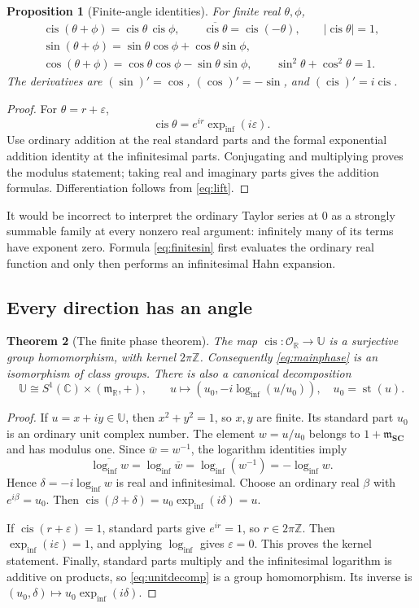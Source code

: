 \documentclass[11pt,letterpaper]{article}
\newtheorem{theorem}{Theorem}[section]
\newtheorem{proposition}[theorem]{Proposition}
\theoremstyle{definition}
\theoremstyle{remark}
\newcommand{\SC}{\mathbf{SC}}
\newcommand{\R}{\mathbb R}\newcommand{\C}{\mathbb C}
\newcommand{\Z}{\mathbb Z}\newcommand{\N}{\mathbb N}
\newcommand{\OO}{\mathcal O}\newcommand{\mm}{\mathfrak m}
\newcommand{\UU}{\mathbb U}\newcommand{\HH}{\mathcal H}
\newcommand{\st}{\operatorname{st}}
\newcommand{\cis}{\operatorname{cis}}
\newcommand{\expi}{\operatorname{exp}_{\mathrm{inf}}}
\newcommand{\logi}{\operatorname{log}_{\mathrm{inf}}}
\numberwithin{equation}{section}
\begin{document}
\begin{proposition}[Finite-angle identities]\label{prop:finiteidentities}
For finite real $\theta,\phi$,
\begin{gather*}
 \cis(\theta+\phi)=\cis\theta\,\cis\phi,\qquad
 \overline{\cis\theta}=\cis(-\theta),\qquad |\cis\theta|=1,\\
 \sin(\theta+\phi)=\sin\theta\cos\phi+\cos\theta\sin\phi,\\
 \cos(\theta+\phi)=\cos\theta\cos\phi-\sin\theta\sin\phi,\qquad
 \sin^2\theta+\cos^2\theta=1.
\end{gather*}
The derivatives are $(\sin)'=\cos$, $(\cos)'=-\sin$, and $(\cis)'=i\cis$.
\end{proposition}
\begin{proof}
For $\theta=r+\varepsilon$,
\[
 \cis\theta=e^{ir}\expi(i\varepsilon).
\]
Use ordinary addition at the real standard parts and the formal exponential addition identity at the infinitesimal parts. Conjugating and multiplying proves the modulus statement; taking real and imaginary parts gives the addition formulas. Differentiation follows from \eqref{eq:lift}.
\end{proof}
It would be incorrect to interpret the ordinary Taylor series at $0$ as a strongly summable family at every nonzero real argument: infinitely many of its terms have exponent zero. Formula \eqref{eq:finitesin} first evaluates the ordinary real function and only then performs an infinitesimal Hahn expansion.

\subsection{Every direction has an angle}
\begin{theorem}[The finite phase theorem]\label{thm:phase}
The map $\cis:\OO_{\R}\to\UU$ is a surjective group homomorphism, with kernel $2\pi\Z$. Consequently \eqref{eq:mainphase} is an isomorphism of class groups. There is also a canonical decomposition
\begin{equation}\label{eq:unitdecomp}
 \UU\cong S^1(\C)\times(\mm_{\R},+),\qquad
 u\longmapsto\left(u_0,-i\logi(u/u_0)\right),\quad u_0=\st(u).
\end{equation}
\end{theorem}
\begin{proof}
If $u=x+iy\in\UU$, then $x^2+y^2=1$, so $x,y$ are finite. Its standard part $u_0$ is an ordinary unit complex number. The element $w=u/u_0$ belongs to $1+\mm_{\SC}$ and has modulus one. Since $\bar w=w^{-1}$, the logarithm identities imply
\[
 \overline{\logi w}=\logi\bar w=\logi(w^{-1})=-\logi w.
\]
Hence $\delta=-i\logi w$ is real and infinitesimal. Choose an ordinary real $\beta$ with $e^{i\beta}=u_0$. Then $\cis(\beta+\delta)=u_0\expi(i\delta)=u$.

If $\cis(r+\varepsilon)=1$, standard parts give $e^{ir}=1$, so $r\in2\pi\Z$. Then $\expi(i\varepsilon)=1$, and applying $\logi$ gives $\varepsilon=0$. This proves the kernel statement. Finally, standard parts multiply and the infinitesimal logarithm is additive on products, so \eqref{eq:unitdecomp} is a group homomorphism. Its inverse is $(u_0,\delta)\mapsto u_0\expi(i\delta)$.
\end{proof}
\end{document}
